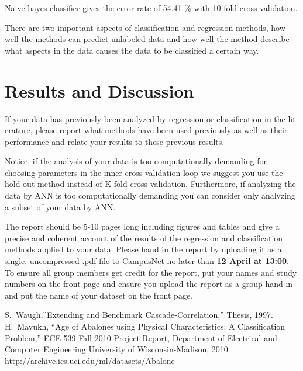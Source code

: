 \documentclass[10pt, paper=a4]{article}
\begin{document}
Naive bayes classifier gives the error rate of 54.41 \% with 10-fold
cross-validation.

There are two important aspects of classification and regression
methods, how well the methods can predict unlabeled data and how well
the method describe what aspects in the data causes the data to be
classified a certain way.


\section{Results and Discussion}
\label{sec:results_and_discussion}
If your data has previously been analyzed by regression or
classification in the lit- erature, please report what methods have
been used previously as well as their performance and relate your
results to these previous results.

Notice, if the analysis of your data is too computationally demanding
for choosing parameters in the inner cross-validation loop we suggest
you use the hold-out method instead of K-fold
cross-validation. Furthermore, if analyzing the data by ANN is too
computationally demanding you can consider only analyzing a subset of
your data by ANN.

The report should be 5-10 pages long including figures and tables and
give a precise and coherent account of the results of the regression
and classification methods applied to your data. Please hand in the
report by uploading it as a single, uncompressed .pdf file to
CampusNet no later than {\bf 12 April at 13:00}.  To ensure all group
members get credit for the report, put your names and study numbers on
the front page and ensure you upload the report as a group hand in and
put the name of your dataset on the front page.
\begin{thebibliography}{99}
	 S.~Waugh,''Extending and Benchmark
  	Cascade-Correlation,'' Thesis, 1997.
	 H.~Mayukh, ``Age of Abalones using Physical
    Characteristics: A Classification Problem,'' ECE 539 Fall 2010
    Project Report, Department of Electrical and Computer Engineering
    University of Wisconsin-Madison, 2010.
     \url{http://archive.ics.uci.edu/ml/datasets/Abalone}
    
\end{thebibliography}
\end{document}
